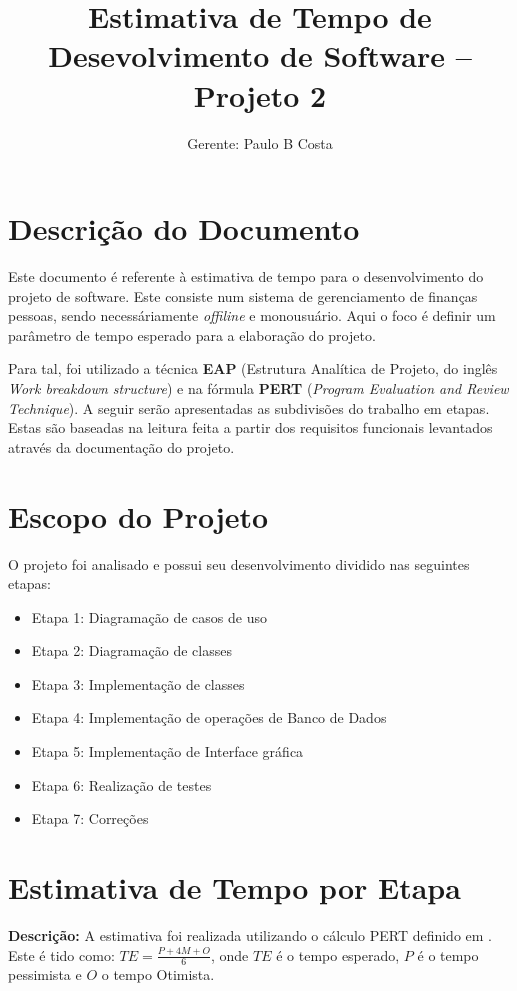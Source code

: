 \documentclass[12pt,a4paper]{report}
\author{Gerente: Paulo B Costa}
\title{Estimativa de Tempo de Desevolvimento de Software -- Projeto 2}
\begin{document}
	\maketitle
	\section*{Descrição do Documento}
	\quotation
	\quad Este documento é referente à estimativa de tempo para o desenvolvimento do projeto de software. Este consiste num sistema de gerenciamento de finanças pessoas, sendo necessáriamente \textit{offiline} e monousuário. Aqui o foco é definir um parâmetro de tempo esperado para a elaboração do projeto.
	
	\quad Para tal, foi utilizado a técnica \textbf{EAP} (Estrutura Analítica de Projeto, do inglês \textit{Work breakdown structure}) e na fórmula \textbf{PERT} (\textit{Program Evaluation and Review Technique}). A seguir serão apresentadas as subdivisões do trabalho em etapas. Estas são baseadas na leitura feita a partir dos requisitos funcionais levantados através da documentação do projeto. 
	\section*{Escopo do Projeto}
	\quad O projeto foi analisado e possui seu desenvolvimento dividido nas seguintes etapas:
	\begin{itemize} 
		\item Etapa 1: Diagramação de casos de uso
		\item Etapa 2: Diagramação de classes
		\item Etapa 3: Implementação de classes
		\item Etapa 4: Implementação de operações de Banco de Dados
		\item Etapa 5: Implementação de Interface gráfica
		\item Etapa 6: Realização de testes
		\item Etapa 7: Correções
		
	\end{itemize}
	\section*{Estimativa de Tempo por Etapa}
	\textbf{Descrição:} A estimativa foi realizada utilizando o cálculo PERT definido em \cite{}. Este é tido como:
	$TE = \frac{P + 4M + O}{6}$, onde $TE$ é o tempo esperado, $P$ é o tempo pessimista e $O$ o tempo Otimista.
	
\end{document}

